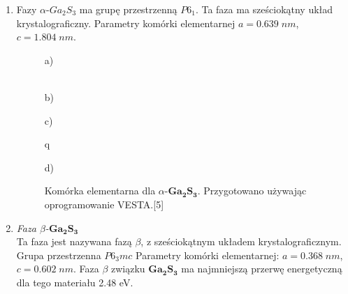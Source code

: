 \begin{enumerate}
	\item Fazy $\alpha$-$Ga_{2}S_{3}$ ma grupę przestrzenną $P6_1$. Ta faza ma sześciokątny układ krystalograficzny. Parametry komórki elementarnej $a=0.639\;nm$, $c=1.804\;nm$.
	
	\begin{figure}[H]
		\begin{minipage}[h]{0.47\linewidth}
			 a) \\
		\end{minipage}
		\hfill
		\begin{minipage}[h]{0.47\linewidth}
			 \\b)
		\end{minipage}
		\vfill
		\begin{minipage}[h]{0.47\linewidth}
			 c) \\
		\end{minipage}q
		\hfill
		\begin{minipage}[h]{0.47\linewidth}
			 d) \\
		\end{minipage}
		\caption{Komórka elementarna dla $\alpha$-$\mathbf{Ga_{2}S_{3}}$. Przygotowano używając oprogramowanie VESTA.[5]}
	\end{figure}

	\item \textit{Faza $\beta$-$\mathbf{Ga_{2}S_{3}}$} \\
	Ta faza jest nazywana fazą $\beta$, z sześciokątnym układem krystalograficznym. Grupa przestrzenna $P6_{3}mc$ Parametry komórki elementarnej: $a=0.368\;nm$,  $c=0.602\;nm$. Faza $\beta$ związku $\mathbf{Ga_{2}S_{3}}$ ma najmniejszą przerwę energetyczną dla tego materiału 2.48 eV.
	

\end{enumerate}
